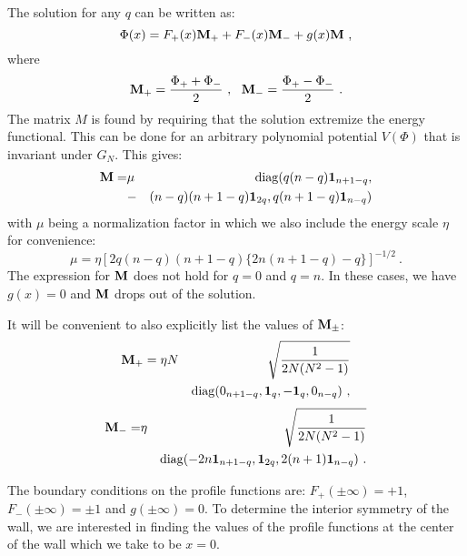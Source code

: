 \documentclass[a4paper,prd,nofootinbib,twocolumn,showpacs]{revtex4}
\begin{document}
The solution for any $q$ can be written as:
\begin{equation}
\Phi (x) = F_+ (x) {\bf M_+} + F_- (x) {\bf M_-} + g(x) {\bf M}\ ,
\label{kinkexplicit2}
\end{equation}
where
\begin{equation}
{\bf M}_+ =  {{\Phi_+ + \Phi_-}\over {2}} \ , \ \ {\bf M}_- =
{{\Phi_+ - \Phi_-}\over {2}} \label{M+M-} \ .
\end{equation}
The matrix $M$ is found by requiring that the solution
extremize the energy functional. This can be done for an
arbitrary polynomial potential $V(\Phi )$ that is invariant
under $G_N$. This gives: 
\begin{eqnarray}
{\bf M} = &\mu& \, {\rm diag} ( q(n-q){\bf 1}_{n+1-q}, \nonumber \\
   &-&(n-q)(n+1-q){\bf 1}_{2q} , q(n+1-q){\bf 1}_{n-q} )
\label{Mresult}
\end{eqnarray}
with $\mu$ being a normalization factor in which we also include
the energy scale $\eta$ for convenience:
\begin{equation}
\mu = \eta [ 2q(n-q)(n+1-q)\{ 2n(n+1-q)-q\} ]^{-1/2} \ .
\label{muvalue}
\end{equation}
The expression for ${\bf M}$ does not hold for $q=0$ and 
$q=n$. In these cases, we have $g(x) =0$ and ${\bf M}$ drops
out of the solution. 

It will be convenient to also explicitly list the values
of ${\bf M}_\pm$:
\begin{eqnarray}
{\bf M}_+ = \eta &N& \sqrt{1 \over {2N(N^2-1)}} \nonumber \\
&{}& {\rm diag} ( 0_{n+1-q}, {\bf 1}_q, -{\bf 1}_q, 0_{n-q} )
\label{M+} \ ,
\end{eqnarray}
\begin{eqnarray}
{\bf M}_- = &\eta&  \sqrt{1 \over {2N(N^2-1)}} \nonumber \\
&{}&{\rm diag} ( -2n {\bf 1}_{n+1-q}, {\bf 1}_{2q},
                 2(n+1){\bf 1}_{n-q} ) \ .
\label{M-}
\end{eqnarray}

The boundary conditions on the profile functions are:
$F_+ (\pm \infty ) = + 1$, $F_- (\pm \infty )= \pm 1$
and $g(\pm \infty ) = 0$. To determine the interior symmetry
of the wall, we are interested in finding the values of the
profile functions at the center of the wall which we take
to be $x=0$.
\end{document}
